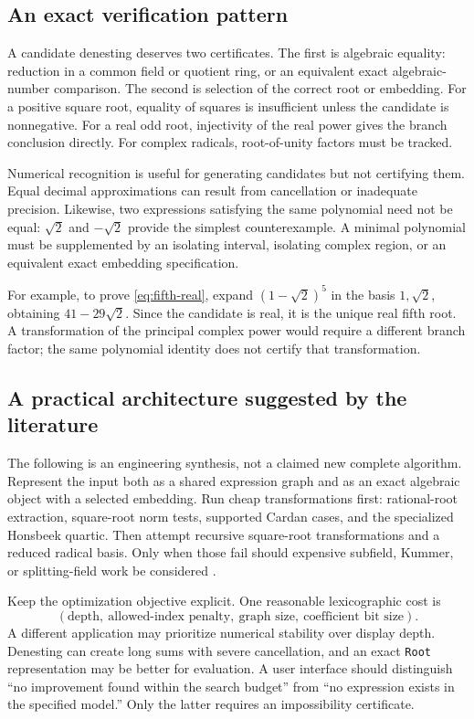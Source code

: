 \documentclass[11pt,a4paper]{article}
\numberwithin{equation}{section}
\theoremstyle{definition}\newtheorem{definition}[theorem]{Definition}
\theoremstyle{remark}\newtheorem{remark}[theorem]{Remark}
\begin{document}
\subsection{An exact verification pattern}
A candidate denesting deserves two certificates. The first is algebraic equality: reduction in a common field or quotient ring, or an equivalent exact algebraic-number comparison. The second is selection of the correct root or embedding. For a positive square root, equality of squares is insufficient unless the candidate is nonnegative. For a real odd root, injectivity of the real power gives the branch conclusion directly. For complex radicals, root-of-unity factors must be tracked.

Numerical recognition is useful for generating candidates but not certifying them. Equal decimal approximations can result from cancellation or inadequate precision. Likewise, two expressions satisfying the same polynomial need not be equal: $\sqrt2$ and $-\sqrt2$ provide the simplest counterexample. A minimal polynomial must be supplemented by an isolating interval, isolating complex region, or an equivalent exact embedding specification.

For example, to prove \eqref{eq:fifth-real}, expand $(1-\sqrt2)^5$ in the basis $1,\sqrt2$, obtaining $41-29\sqrt2$. Since the candidate is real, it is the unique real fifth root. A transformation of the principal complex power would require a different branch factor; the same polynomial identity does not certify that transformation.

\subsection{A practical architecture suggested by the literature}
The following is an engineering synthesis, not a claimed new complete algorithm. Represent the input both as a shared expression graph and as an exact algebraic object with a selected embedding. Run cheap transformations first: rational-root extraction, square-root norm tests, supported Cardan cases, and the specialized Honsbeek quartic. Then attempt recursive square-root transformations and a reduced radical basis. Only when those fail should expensive subfield, Kummer, or splitting-field work be considered \cite{bfht,jeffrey,bloemer93,landau92}.

Keep the optimization objective explicit. One reasonable lexicographic cost is
\[
(\text{depth},\ \text{allowed-index penalty},\ \text{graph size},\
\text{coefficient bit size}).
\]
A different application may prioritize numerical stability over display depth. Denesting can create long sums with severe cancellation, and an exact \texttt{Root} representation may be better for evaluation. A user interface should distinguish ``no improvement found within the search budget'' from ``no expression exists in the specified model.'' Only the latter requires an impossibility certificate.
\end{document}
